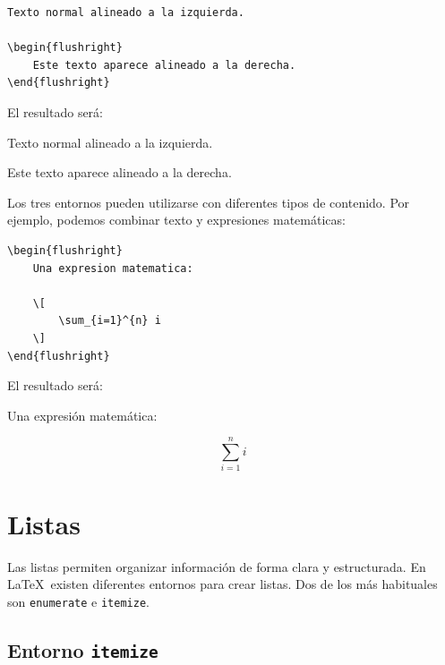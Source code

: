 \documentclass[11pt,a4paper]{article}
\theoremstyle{plain}
\theoremstyle{definition}
\theoremstyle{remark}
\theoremstyle{exercise}
\begin{document}
\begin{lstlisting}
Texto normal alineado a la izquierda.

\begin{flushright}
    Este texto aparece alineado a la derecha.
\end{flushright}
\end{lstlisting}

\noindent El resultado será:

\begin{paginarecuadrada}
Texto normal alineado a la izquierda.

\begin{flushright}
    Este texto aparece alineado a la derecha.
\end{flushright}
\end{paginarecuadrada}

\medskip

Los tres entornos pueden utilizarse con diferentes tipos de contenido. Por ejemplo, podemos combinar texto y expresiones matemáticas:

\begin{lstlisting}
\begin{flushright}
    Una expresion matematica:

    \[
        \sum_{i=1}^{n} i
    \]
\end{flushright}
\end{lstlisting}

\noindent El resultado será:

\begin{paginarecuadrada}
\begin{flushright}
    Una expresión matemática:

    \[
        \sum_{i=1}^{n} i
    \]
\end{flushright}
\end{paginarecuadrada}


\section{Listas}

Las listas permiten organizar información de forma clara y estructurada. En \LaTeX\ existen diferentes entornos para crear listas. Dos de los más habituales son \verb|enumerate| e \verb|itemize|.

\subsection{Entorno \texttt{itemize}}
\end{document}
